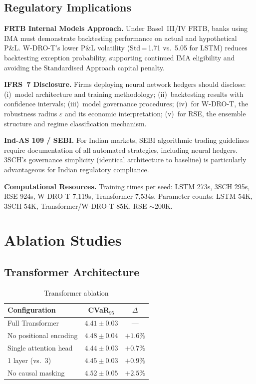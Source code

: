 \documentclass[11pt]{article}
\begin{document}
\subsection{Regulatory Implications}

\textbf{FRTB Internal Models Approach.}
Under Basel~III/IV FRTB, banks using IMA must demonstrate backtesting performance on actual and hypothetical P\&L.  W-DRO-T's lower P\&L volatility (Std\,=\,1.71 vs.\ 5.05 for LSTM) reduces backtesting exception probability, supporting continued IMA eligibility and avoiding the Standardised Approach capital penalty.

\textbf{IFRS~7 Disclosure.}
Firms deploying neural network hedgers should disclose: (i)~model architecture and training methodology; (ii)~backtesting results with confidence intervals; (iii)~model governance procedures; (iv)~for W-DRO-T, the robustness radius $\varepsilon$ and its economic interpretation; (v)~for RSE, the ensemble structure and regime classification mechanism.

\textbf{Ind-AS 109 / SEBI.}
For Indian markets, SEBI algorithmic trading guidelines require documentation of all automated strategies, including neural hedgers.  3SCH's governance simplicity (identical architecture to baseline) is particularly advantageous for Indian regulatory compliance.

\textbf{Computational Resources.}
Training times per seed: LSTM 273s, 3SCH 295s, RSE 924s, W-DRO-T 7{,}119s, Transformer 7{,}534s.  Parameter counts: LSTM 54K, 3SCH 54K, Transformer/W-DRO-T 85K, RSE $\sim$200K.

\section{Ablation Studies}
\label{sec:ablation}

\subsection{Transformer Architecture}

\begin{table}[t]
\centering
\caption{Transformer ablation}
\label{tab:abl_trans}
\small
\begin{tabular}{lcc}
\toprule
\textbf{Configuration} & \textbf{CVaR$_{95}$} & \textbf{$\Delta$} \\
\midrule
Full Transformer & $4.41 \pm 0.03$ & --- \\
No positional encoding & $4.48 \pm 0.04$ & $+1.6\%$ \\
Single attention head & $4.44 \pm 0.03$ & $+0.7\%$ \\
1 layer (vs.\ 3) & $4.45 \pm 0.03$ & $+0.9\%$ \\
No causal masking & $4.52 \pm 0.05$ & $+2.5\%$ \\
\bottomrule
\end{tabular}
\end{table}
\end{document}
